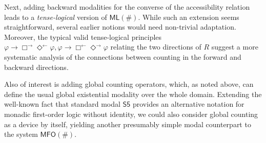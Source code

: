 \documentclass[12pt,oneside,reqno]{amsart}
\theoremstyle{definition}
\begin{document}
Next, adding backward modalities for the converse of the accessibility relation leads to a \emph{tense-logical} version of $\mathsf{ML}(\#)$. While such an extension seems straightforward, several earlier notions would need non-trivial adaptation. Moreover, the typical valid tense-logical principles $ \varphi \rightarrow \Box^{\rightarrow}\Diamond^{\leftarrow}\varphi,\varphi \rightarrow \Box^{\leftarrow}\Diamond^{\rightarrow}\varphi $ relating the two directions of $R$ suggest a more systematic analysis of the connections between counting in the forward and backward directions. 

Also of interest is adding global counting operators, which, as noted above, can define the usual global existential modality over the whole domain. Extending the well-known fact that standard modal $\mathsf{S5}$ provides  an alternative notation for monadic first-order logic without identity, we could also consider global counting as a device by itself, yielding another presumably simple modal counterpart  to the system $\mathsf{MFO}(\#)$.






\end{document}
